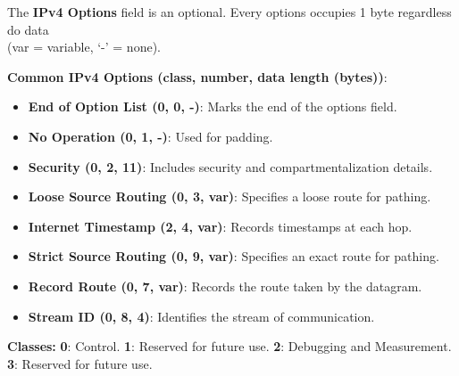     
\newpage

\begin{Def}

    The \textbf{IPv4 Options} field is an optional. Every options occupies 1 byte regardless do data\\
    \hfill (var = variable, `-' = none).
    
    \textbf{Common IPv4 Options (class, number, data length (bytes))}:
    \begin{itemize}
        \item \textbf{End of Option List (0, 0, -)}: Marks the end of the options field.
        \item \textbf{No Operation (0, 1, -)}: Used for padding.
        \item \textbf{Security (0, 2, 11)}: Includes security and compartmentalization details.
        \item \textbf{Loose Source Routing (0, 3, var)}: Specifies a loose route for pathing.
        \item \textbf{Internet Timestamp (2, 4, var)}: Records timestamps at each hop.
        \item \textbf{Strict Source Routing (0, 9, var)}: Specifies an exact route for pathing.
        \item \textbf{Record Route (0, 7, var)}: Records the route taken by the datagram.
        \item \textbf{Stream ID (0, 8, 4)}: Identifies the stream of communication.
    \end{itemize}

    \noindent
    \textbf{Classes:} \textbf{0}: Control. \textbf{1}: Reserved for future use. \textbf{2}: Debugging and Measurement.\\
    \textbf{3}: Reserved for future use. \hfill \cite{rfc791}
\end{Def}

